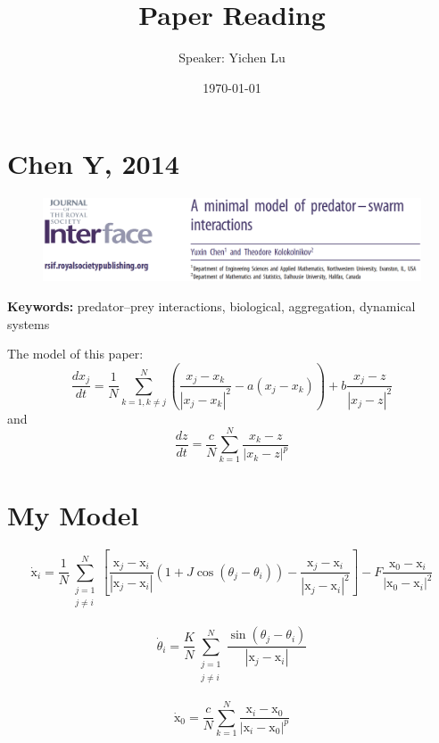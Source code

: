 \documentclass[10pt,aspectratio=43,mathserif,table]{beamer}
\title{Paper Reading}
\author{Speaker: Yichen Lu\quad \newline  \newline \quad }
\institute{\fontsize{8pt}{14pt}}
\date{\today}
\begin{document}
\section{Chen Y, 2014}

\begin{frame}
	\begin{figure}
		\centering
		\includegraphics[width=\textwidth]{ChenY2014Face.jpg}
	\end{figure}
	
	\textbf{Keywords:}  predator–prey interactions, biological, aggregation, dynamical systems
\end{frame}

\begin{frame}
    The model of this paper:
	$$
	\frac{dx_j}{dt}=\frac{1}{N}\sum_{k=1,k\ne j}^N{\left( \frac{x_j-x_k}{\left| x_j-x_k \right|^2}-a\left( x_j-x_k \right) \right) +b\frac{x_j-z}{\left| x_j-z \right|^2}}
	$$
	and
	$$
	\frac{dz}{dt}=\frac{c}{N}\sum_{k=1}^N{\frac{x_k-z}{\left| x_k-z \right|^p}}
	$$
\end{frame}

\section{My Model}

\begin{frame}
    $$
    \dot{\mathrm{x}}_i=\frac{1}{N}\sum_{\begin{array}{c}
        j=1\\
        j\ne i\\
    \end{array}}^N{\left[ \frac{\mathrm{x}_j-\mathrm{x}_i}{\left| \mathrm{x}_j-\mathrm{x}_i \right|}\left( 1+J\cos \left( \theta _j-\theta _i \right) \right) -\frac{\mathrm{x}_j-\mathrm{x}_i}{\left| \mathrm{x}_j-\mathrm{x}_i \right|^2} \right]}-F\frac{\mathrm{x}_0-\mathrm{x}_i}{\left| \mathrm{x}_0-\mathrm{x}_i \right|^2}
    $$

    $$
    \dot{\theta}_i=\frac{K}{N}\sum_{\begin{array}{c}
        j=1\\
        j\ne i\\
    \end{array}}^N{\frac{\sin \left( \theta _j-\theta _i \right)}{\left| \mathrm{x}_j-\mathrm{x}_i \right|}}
    $$

	$$
	\dot{\mathrm{x}}_0=\frac{c}{N}\sum_{k=1}^N{\frac{\mathrm{x}_i-\mathrm{x}_0}{\left| \mathrm{x}_i-\mathrm{x}_0 \right|^p}}
	$$

\end{frame}



\end{document}
